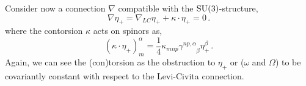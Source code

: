 \documentclass[debug]{phd}
\begin{document}
				
				Consider now a connection $\nabla$ compatible with the $\mathrm{SU}(3)$-structure,
						\begin{equation}\label{covdereta}
							\nabla \eta_+ = \nabla_{LC} \eta_+ + \kappa \cdot \eta_+ = 0\, .
						\end{equation}
				where the contorsion $\kappa$ acts on spinors as,
						\begin{equation}
							(\kappa \cdot \eta_+)_{m}^{\alpha} = \frac{1}{4} \kappa_{mnp} \gamma^{np, \alpha}_{\phantom{np,\alpha}\beta} \eta_{+}^\beta \, .
						\end{equation}
				Again, we can see the (con)torsion as the obstruction to $\eta_+$ or ($\omega$ and $\Omega$) to be covariantly constant with respect to the Levi-Civita connection.
				
\end{document}
